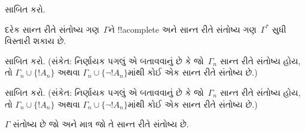\documentclass[../../../include/open-logic-section]{subfiles}
\begin{document}

\begin{prob}
 સાબિત કરો.
\end{prob}
\tagendprob

\begin{lem}
 દરેક સાન્ત રીતે સંતોષ્ય ગણ~$\Gamma$ને
!!a{complete} અને સાન્ત રીતે સંતોષ્ય ગણ~$\Gamma^*$ સુધી વિસ્તારી શકાય
છે.
\end{lem}

\begin{prob}
 સાબિત કરો. (સંકેત: નિર્ણાયક
પગલું એ બતાવવાનું છે કે જો~$\Gamma_n$ સાન્ત રીતે સંતોષ્ય હોય, તો
$\Gamma_n\cup\{!A_n\}$ અથવા $\Gamma_n\cup\{\lnot !A_n\}$માંથી કોઈ એક
સાન્ત રીતે સંતોષ્ય છે.)
\end{prob}
\tagendprob

\begin{prob}
 સાબિત કરો. (સંકેત: નિર્ણાયક
પગલું એ બતાવવાનું છે કે જો~$\Gamma_n$ સાન્ત રીતે સંતોષ્ય હોય, તો
$\Gamma_n\cup\{!A_n\}$ અથવા $\Gamma_n\cup\{\lnot !A_n\}$માંથી કોઈ એક
સાન્ત રીતે સંતોષ્ય છે.)
\end{prob}
\tagendprob

\begin{thm}[સઘનતા]
 $\Gamma$ સંતોષ્ય છે જો અને માત્ર જો તે
સાન્ત રીતે સંતોષ્ય છે.
\end{thm}
\end{document}
